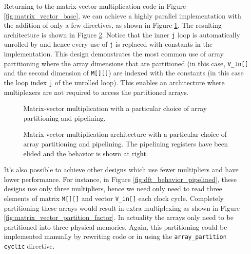 Returning to the matrix-vector multiplication code in Figure \ref{fig:matrix_vector_base}, we can achieve a highly parallel implementation with the addition of only a few directives, as shown in Figure \ref{fig:matrix_vector_optimized}.  The resulting architecture is shown in Figure \ref{fig:matrix_vector_optimized_behavior}.  Notice that the inner \lstinline|j| loop is automatically unrolled by \VHLS and hence every use of \lstinline|j| is replaced with constants in the implementation.   This design demonstrates the most common use of array partitioning where the array dimensions that are partitioned (in this case, \lstinline|V_In[]| and the second dimension of \lstinline|M[][]|) are indexed with the constants (in this case the loop index \lstinline|j| of the unrolled loop).  This enables an architecture where multiplexers are not required to access the partitioned arrays.

\begin{figure}

\caption{Matrix-vector multiplication with a particular choice of array partitioning and pipelining. }
\label{fig:matrix_vector_optimized}
\end{figure}

\begin{figure}

\caption{Matrix-vector multiplication architecture with a particular choice of array partitioning and pipelining.  The pipelining registers have been elided and the behavior is shown at right.}
\label{fig:matrix_vector_optimized_behavior}
\end{figure}

It's also possible to achieve other designs which use fewer multipliers and have lower performance.   For instance, in Figure \ref{fig:dft_behavior_pipelined}, these designs use only three multipliers, hence we need only need to read three elements of matrix \lstinline|M[][]| and vector \lstinline|V_in[]| each clock cycle. Completely partitioning these arrays would result in extra multiplexing as shown in Figure \ref{fig:matrix_vector_partition_factor}.  In actuality the arrays only need to be partitioned into three physical memories.  Again, this partitioning could be implemented manually by rewriting code or in \VHLS using the \lstinline|array_partition cyclic| directive.


